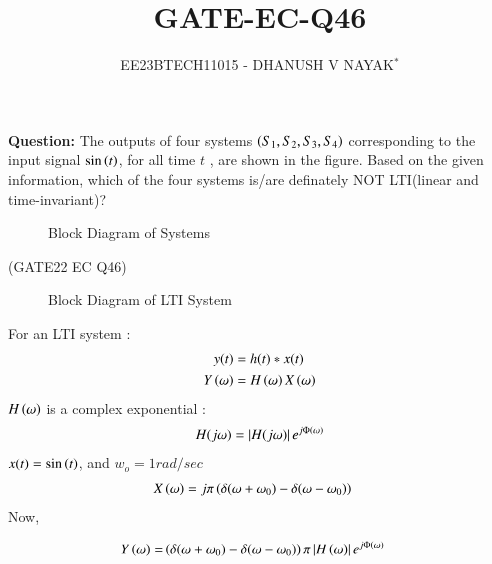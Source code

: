 \documentclass[journal,12pt,twocolumn]{IEEEtran}
\theoremstyle{remark}
\begin{document}

\title{GATE-EC-Q46}
\author{EE23BTECH11015 - DHANUSH V NAYAK$^{*}$%
}
\maketitle
\newpage
\bigskip
\renewcommand{\thefigure}{\arabic{figure}}
\renewcommand{\thetable}{\theenumi}
\textbf{Question:} The outputs of four systems $\left(S_{1} , S_{2} , S_{3},S_{4}\right)$ corresponding to the input signal $\sin\left(t\right)$, for all time $t$ , are shown in the figure. Based on the given information, which of the four systems is/are definately NOT LTI(linear and time-invariant)? 
\begin{figure}[H]
    \resizebox{0.34\textwidth}{!}{}
    \caption{Block Diagram of Systems}
    \label{fig:question_fig}
\end{figure}
\hfill(GATE22 EC Q46)\\
\solution 

\begin{figure}[H]
    \resizebox{0.55\textwidth}{!}{
    }
    \caption{Block Diagram of LTI System}
    \label{fig:LTI_system}
\end{figure}
For an LTI system :
\begin{align}
    y(t)&=h(t)*x(t)\\
    Y\left(\omega\right)&=H\left(\omega\right)X\left(\omega\right)
\end{align}
$H\left(\omega\right)$ is a complex exponential :
\begin{align}
    H(j\omega)=\left\vert H(j\omega)\right\vert e^{j\Phi\left(\omega\right)}
\end{align}
$x(t)=\sin\left(t\right)$, and $w_{o}=1 rad/sec$
\begin{align}
    X\left(\omega\right)&=j\pi \left(\delta(\omega+\omega_0)-\delta(\omega-\omega_0)\right)
\end{align}
Now,

\begin{align}
    Y\left(\omega\right)=&\left(\delta(\omega+\omega_0)-\delta(\omega-\omega_0)\right)\pi \left\vert H\left(\omega\right)\right\vert e^{j\Phi\left(\omega\right)}\label{eq:gate22_ec_q46.1}
\end{align}
\end{document}
